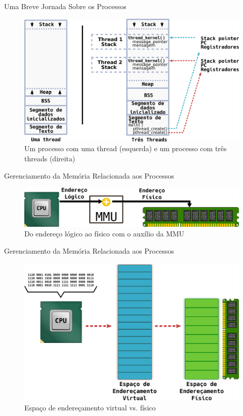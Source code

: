 \documentclass[xcolor={usenames,svgnames,dvipsnames},brazil,english,12pt,aspectratio=149]{beamer}
\begin{document}
\begin{frame}{Uma Breve Jornada Sobre os Processos}
	\begin{figure}[!h]
		\centering
		\includegraphics[width=.80\textwidth]{theads_and_stack} 
		\caption[Um processo com uma thread e um processo com três threads]{Um processo com uma thread (esquerda) e um processo com três threads (direita)\label{fig:stack_threads}}
	\end{figure}
\end{frame}

\begin{frame}{Gerenciamento da Memória Relacionada aos Processos}
	\begin{figure}[!h]
		\centering
		\includegraphics[width=\textwidth]{mmu} 
		\caption{Do endereço lógico ao físico com o auxílio da MMU}
		\label{fig:mmu}
	\end{figure}
\end{frame}

\begin{frame}{Gerenciamento da Memória Relacionada aos Processos}
	\begin{figure}[!h]
		\centering
		\includegraphics[width=.5\textwidth]{virtual_vs_fisico} 
		\caption{Espaço de endereçamento virtual vs. físico}
		\label{fig:vas_pas}
	\end{figure}
\end{frame}
\end{document}
